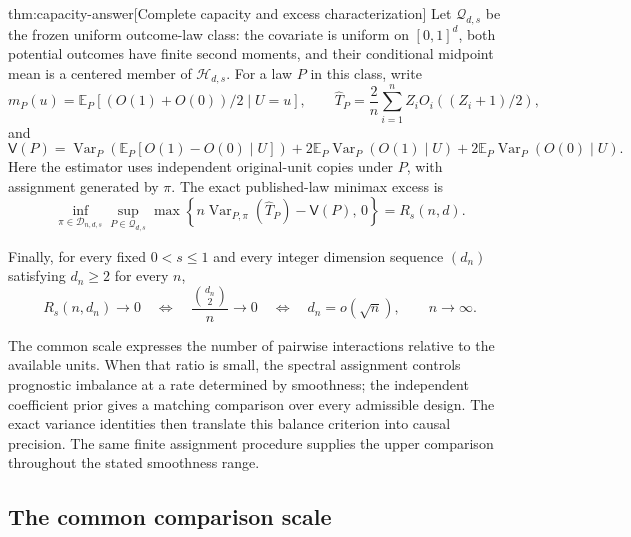\documentclass[11pt]{article}
\begin{document}
\begin{theoremv}{thm:capacity-answer}[Complete capacity and excess characterization]
Let \(\mathcal Q_{d,s}\) be the frozen uniform outcome-law class: the covariate is uniform on \([0,1]^d\), both potential outcomes have finite second moments, and their conditional midpoint mean is a centered member of \(\mathcal H_{d,s}\). For a law \(P\) in this class, write
\[
m_P(u)=\mathbb E_P[(O(1)+O(0))/2\mid U=u],
\qquad
\widehat T_P=\frac2n\sum_{i=1}^n Z_iO_i((Z_i+1)/2),
\]
and
\[
\mathsf V(P)
=
\operatorname{Var}_P\!\left(
\mathbb E_P[O(1)-O(0)\mid U]\right)
+
2\mathbb E_P\operatorname{Var}_P(O(1)\mid U)
+
2\mathbb E_P\operatorname{Var}_P(O(0)\mid U).
\]
Here the estimator uses independent original-unit copies under \(P\), with assignment generated by \(\pi\). The exact published-law minimax excess is
\[
\inf_{\pi\in\mathcal D_{n,d,s}}
\sup_{P\in\mathcal Q_{d,s}}
\max\!\left\{
n\operatorname{Var}_{P,\pi}(\widehat T_P)-\mathsf V(P),\,0
\right\}
=
R_s(n,d).
\]

Finally, for every fixed \(0<s\leq1\) and every integer dimension sequence \((d_n)\) satisfying \(d_n\geq2\) for every \(n\),
\[
R_s(n,d_n)\longrightarrow0
\quad\Longleftrightarrow\quad
\frac{\binom{d_n}{2}}{n}\longrightarrow0
\quad\Longleftrightarrow\quad
d_n=o(\sqrt n),
\qquad n\longrightarrow\infty.
\]
\end{theoremv}

The common scale expresses the number of pairwise interactions relative to the available units. When that ratio is small, the spectral assignment controls prognostic imbalance at a rate determined by smoothness; the independent coefficient prior gives a matching comparison over every admissible design. The exact variance identities then translate this balance criterion into causal precision. The same finite assignment procedure supplies the upper comparison throughout the stated smoothness range.

\subsection{The common comparison scale}
\end{document}
